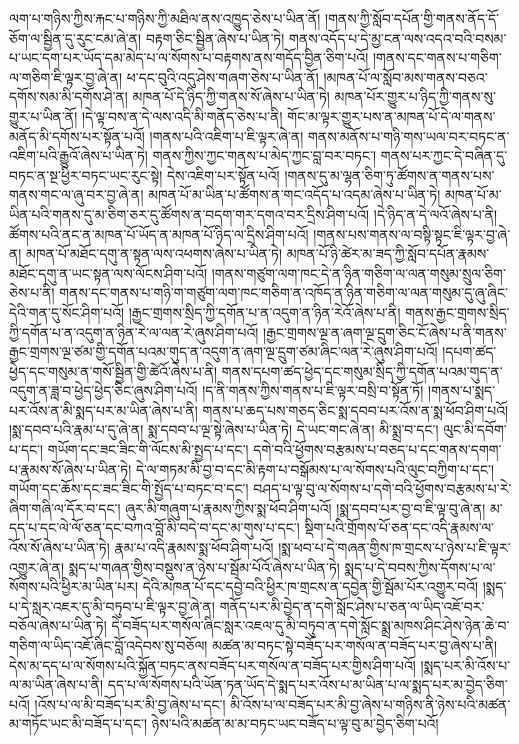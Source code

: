 ལག་པ་གཉིས་ཀྱིས་རྐང་པ་གཉིས་ཀྱི་མཐིལ་ནས་འཁྱུད་ཅེས་པ་ཡིན་ནོ། །གནས་ཀྱི་སློབ་དཔོན་གྱི་གནས་ནོད་དོ་ཅོག་ལ་སྦྱིན་དུ་རུང་ངམ་ཞེ་ན། བརྟག་ཅིང་སྦྱིན་ཞེས་པ་ཡིན་ཏེ། གནས་འདོད་པ་དེ་མྱ་ངན་ལས་འདའ་བའི་བསམ་པ་ཡང་དག་པར་ཡོད་དམ་མེད་པ་ལ་སོགས་པ་བརྟགས་ནས་གདོད་བྱིན་ཅིག་པའོ། །གནས་དང་གནས་པ་གཅིག་ལ་གཅིག་ཇི་ལྟར་བྱ་ཞེ་ན། ཕ་དང་བུའི་འདུ་ཤེས་གཞག་ཅེས་པ་ཡིན་ནོ། །མཁན་པོ་ལ་སློབ་མས་གནས་བཅའ་དགོས་སམ་མི་དགོས་ཤེ་ན། མཁན་པོ་དེ་ཉིད་ཀྱི་གནས་སོ་ཞེས་པ་ཡིན་ཏེ། མཁན་པོར་གྱུར་པ་ཉིད་ཀྱི་གནས་སུ་གྱུར་པ་ཡིན་ནོ། །དེ་ལྟ་བས་ན་དེ་ལས་འདི་མི་གནོད་ཅེས་པ་ནི། གོང་མ་ལྟར་གྱུར་པས་ན་མཁན་པོ་དེ་ལ་གནས་མནོད་མི་དགོས་པར་སྟོན་པའོ། །གནས་པའི་འཇིག་པ་ཇི་ལྟར་ཞེ་ན། གནས་མནོས་པ་གཉི་གས་ཡལ་བར་བཏང་ན་འཇིག་པའི་རྒྱུའོ་ཞེས་པ་ཡིན་ཏེ། གནས་ཀྱིས་ཀྱང་གནས་པ་མེད་ཀྱང་བླ་བར་བཏང་། གནས་པར་ཀྱང་དེ་བཞིན་དུ་བཏང་ན་སྔ་ཕྱིར་བཏང་ཡང་རུང་སྟེ། དེས་འཇིག་པར་སྟོན་པའོ། །གནས་དུ་མ་ལྷན་ཅིག་ཏུ་ཚོགས་ན་གནས་པས་གནས་གང་ལ་ཞུ་བར་བྱ་ཞེ་ན། མཁན་པོ་མ་ཡིན་པ་ཚོགས་ན་གང་འདོད་པ་འདམ་ཞེས་པ་ཡིན་ཏེ། མཁན་པོ་མ་ཡིན་པའི་གནས་དུ་མ་ཅིག་ཅར་དུ་ཚོགས་ན་བདག་གར་དགའ་བར་དྲིས་ཤིག་པའོ། །དེ་ཉིད་ན་དེ་ལའོ་ཞེས་པ་ནི། ཚོགས་པའི་ནང་ན་མཁན་པོ་ཡོད་ན་མཁན་པོ་ཉིད་ལ་དྲིས་ཤིག་པའོ། །གནས་པས་གནས་ལ་བསྟི་སྟང་ཇི་ལྟར་བྱ་ཞེ་ན། མཁན་པོ་མཐོང་དགུ་ན་སྟན་ལས་འཕགས་ཞེས་པ་ཡིན་ཏེ། མཁན་པོ་ཉི་ཚེར་མ་ཟད་ཀྱི་སློབ་དཔོན་རྣམས་མཐོང་དགུ་ན་ཡང་སྟན་ལས་ལོངས་ཤིག་པའོ། །གནས་གཙུག་ལག་ཁང་དེ་ན་ཉིན་གཅིག་ལ་ལན་གསུམ་སྲུལ་ཅིག་ཅེས་པ་ནི། གནས་དང་གནས་པ་གཉི་ག་གཙུག་ལག་ཁང་གཅིག་ན་འཁོད་ན་ཉིན་གཅིག་ལ་ལན་གསུམ་དུ་ཞུ་ཞིང་དེའི་གན་དུ་སོང་ཤིག་པའོ། །རྒྱང་གྲགས་སྲིད་ཀྱི་དགོན་པ་ན་འདུག་ན་ཉིན་རེའོ་ཞེས་པ་ནི། གནས་རྒྱང་གྲགས་སྲིད་ཀྱི་དགོན་པ་ན་འདུག་ན་ཉིན་རེ་ལ་ལན་རེ་ཞུས་ཤིག་པའོ། །རྒྱང་གྲགས་ལྔ་ན་ཞག་ལྔ་དྲུག་ཅིང་ངོ་ཞེས་པ་ནི་གནས་རྒྱང་གྲགས་ལྔ་ཙམ་གྱི་དགོན་པའམ་གུད་ན་འདུག་ན་ཞག་ལྔ་དྲུག་ཙམ་ཞིང་ལན་རེ་ཞུས་ཤིག་པའོ། །དཔག་ཚད་ཕྱེད་དང་གསུམ་ན་གསོ་སྦྱིན་གྱི་ཚེའོ་ཞེས་པ་ནི། གནས་དཔག་ཚད་ཕྱེད་དང་གསུམ་སྲིད་ཀྱི་དགོན་པའམ་གུད་ན་འདུག་ན་ཟླ་བ་ཕྱེད་ཕྱེད་ཅིང་ཞུས་ཤིག་པའོ། །ད་ནི་གནས་ཀྱིས་གནས་པ་ཇི་ལྟར་བསྲི་བ་སྟོན་ཏོ། །གནས་པ་སྨད་པར་འོས་ན་མི་སྨད་པར་མ་ཡིན་ཞེས་པ་ནི། གནས་པ་ཆད་པས་གཅད་ཅིང་སྨ་དབབ་པར་འོས་ན་སྨ་ཕོབ་ཤིག་པའོ། །སྨ་དབབ་པའི་རྣམ་པ་དུ་ཞེ་ན། སྨ་དབབ་པ་ལྔ་སྟེ་ཞེས་པ་ཡིན་ཏེ། དེ་ཡང་གང་ཞེ་ན། མི་སྨྲ་བ་དང་། ལུང་མི་དབོག་པ་དང་། གཡོག་དང་ཟང་ཟིང་གི་ལོངས་མི་སྤྱད་པ་དང་། དགེ་བའི་ཕྱོགས་བརྩམས་པ་བཅད་པ་དང་གནས་དགག་པ་རྣམས་སོ་ཞེས་པ་ཡིན་ཏེ། དེ་ལ་གཏམ་མི་བྱ་བ་དང་མི་རྟག་པ་བསྒོམས་པ་ལ་སོགས་པའི་ལུང་བཀྱིག་པ་དང་། གཡོག་དང་ཆོས་དང་ཟང་ཟིང་གི་སྤྱོད་པ་བཏང་བ་དང་། བཤད་པ་ལྟ་བུ་ལ་སོགས་པ་དགེ་བའི་ཕྱོགས་བརྩམས་པ་རེ་ཞིག་གཞི་ལ་དོར་བ་དང་། ཞུར་མི་གཞུག་པ་རྣམས་ཀྱིས་སྨ་ཕོབ་ཤིག་པའོ། །སྨ་དབབ་པར་བྱ་བ་ཇི་ལྟ་བུ་ཞེ་ན། མ་དད་པ་དང་ལེ་ལོ་ཅན་དང་བཀའ་བློ་མི་བདེ་བ་དང་མ་གུས་པ་དང་། སྡིག་པའི་གྲོགས་པོ་ཅན་དང་འདི་རྣམས་ལ་འོས་སོ་ཞེས་པ་ཡིན་ཏེ། རྣམ་པ་འདི་རྣམས་སྨ་ཕོབ་ཤིག་པའོ། །སྨ་ཕབ་པ་དེ་གཞན་གྱིས་ཁ་གྲངས་པ་ཉེས་པ་ཇི་ལྟར་འགྱུར་ཞེ་ན། སྨད་པ་གཞན་གྱིས་བསྡུས་ན་ཉེས་པ་སྦོམ་པོའོ་ཞེས་པ་ཡིན་ཏེ། སྨད་པ་དེ་བབས་ཀྱིས་དོགས་པ་ལ་སོགས་པའི་ཕྱིར་མ་ཡིན་པར། དེའི་མཁན་པོ་དང་དབྱེ་བའི་ཕྱིར་ཁ་གྲངས་ན་དབྱེན་གྱི་སྦོམ་པོར་འགྱུར་བའོ། །སྨད་པ་དེ་སླར་འཇར་དུ་མི་བཏུབ་པ་ཇི་ལྟར་བྱ་ཞེ་ན། གནོད་པར་མི་བྱེད་ན་དགེ་སློང་ཤེས་པ་ཅན་ལ་ཡིད་འཇོ་བར་བཅོལ་ཞེས་པ་ཡིན་ཏེ། དེ་བཟོད་པར་གསོལ་ཞིང་སླར་འཇལ་དུ་མི་བཏུབ་ན་དགེ་སློང་སྨྲ་མཁས་ཤིང་ཤེས་ཉེན་ཆེ་བ་གཅིག་ལ་ཡིད་འཇོ་ཞིང་བློ་འདེབས་སུ་བཅོལ། མཚན་མ་བཏང་སྟེ་བཟོད་པར་གསོལ་ན་བཟོད་པར་བྱ་ཞེས་པ་ནི། དེས་མ་དད་པ་ལ་སོགས་པའི་སྐྱོན་བཏང་ནས་བཟོད་པར་གསོལ་ན་བཟོད་པར་གྱིས་ཤིག་པའོ། །སྨད་པར་མི་འོས་པ་ལ་མ་ཡིན་ཞེས་པ་ནི། དད་པ་ལ་སོགས་པའི་ཡོན་ཏན་ཡོད་དེ་སྨད་པར་འོས་པ་མ་ཡིན་པ་ལ་སྨད་པར་མ་བྱེད་ཅིག་པའོ། །འོས་པ་ལ་མི་བཟོད་པར་མི་བྱ་ཞེས་པ་དང་། མི་འོས་པ་ལ་བཟོད་པར་མི་བྱ་ཞེས་པ་གཉིས་ནི་ཉེས་པའི་མཚན་མ་གཏོང་ཡང་མི་བཟོད་པ་དང་། ཉེས་པའི་མཚན་མ་མ་བཏང་ཡང་བཟོད་པ་ལྟ་བུ་མ་བྱེད་ཅིག་པའོ། 